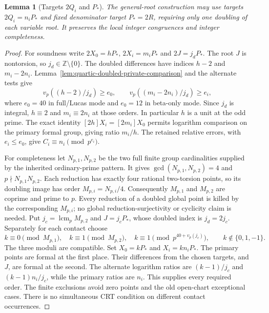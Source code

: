 \documentclass[11pt]{article}
\newtheorem{lemma}[theorem]{Lemma}
\theoremstyle{definition}
\theoremstyle{remark}
\newcommand{\Z}{\mathbb Z}
\begin{document}
\begin{lemma}[Targets $2Q_i$ and $P_*$]
\label{lem:quartic-target-two}
The general-root construction may use targets $2Q_i=n_iP_*$ and fixed
denominator target $P_*=2R$, requiring only one doubling of each variable
root. It preserves the local integer congruences and integer completeness.
\end{lemma}
\begin{proof}
For soundness write $2X_0=hP_*$, $2X_i=m_iP_*$ and $2J=j_dP_*$.
The root $J$ is nontorsion, so $j_d\in\Z\setminus\{0\}$.
The doubled differences have indices $h-2$ and $m_i-2n_i$.
Lemma~\ref{lem:quartic-doubled-private-comparison} and the alternate
tests give
\[
 v_p((h-2)/j_d)\ge e_0,\qquad
 v_p((m_i-2n_i)/j_d)\ge e_i,
\]
where $e_0=40$ in full/Lucas mode and $e_0=12$ in beta-only mode.
Since $j_d$ is integral, $h\equiv2$ and $m_i\equiv2n_i$ at those orders.
In particular $h$ is a unit at the odd prime. The exact identity
$[2h]X_i=[2m_i]X_0$ permits logarithm comparison on the primary formal
group, giving ratio $m_i/h$. The retained relative errors, with
$e_i\le e_0$, give $C_i\equiv n_i\pmod{p^{e_i}}$.

For completeness let $N_{p,1},N_{p,2}$ be the two full finite group
cardinalities supplied by the inherited ordinary-prime pattern. It gives
$\gcd(N_{p,1},N_{p,2})=4$ and $p\nmid N_{p,1}N_{p,2}$. Each reduction
has exactly four rational two-torsion points, so its doubling image has
order $M_{p,i}=N_{p,i}/4$. Consequently $M_{p,1}$ and $M_{p,2}$ are
coprime and prime to $p$. Every reduction of a doubled global point is
killed by the corresponding $M_{p,i}$; no global reduction-surjectivity
or cyclicity claim is needed.
Put $j_c=\operatorname{lcm}_p M_{p,2}$ and $J=j_cP_*$, whose doubled
index is $j_d=2j_c$. Separately for each contact choose
\[
 k\equiv0\pmod{M_{p,1}},\quad
 k\equiv1\pmod{M_{p,2}},\quad
 k\equiv1\pmod{p^{40+v_p(j_c)}},\qquad k\notin\{0,1,-1\}.
\]
The three moduli are compatible. Set $X_0=kP_*$ and $X_i=kn_iP_*$.
The primary points are formal at the first place. Their differences from
the chosen targets, and $J$, are formal at the second. The alternate
logarithm ratios are $(k-1)/j_c$ and $(k-1)n_i/j_c$, while the primary
ratios are $n_i$. This supplies every required order. The finite exclusions
avoid zero points and the old open-chart exceptional cases. There is no
simultaneous CRT condition on different contact occurrences.
\end{proof}
\end{document}
